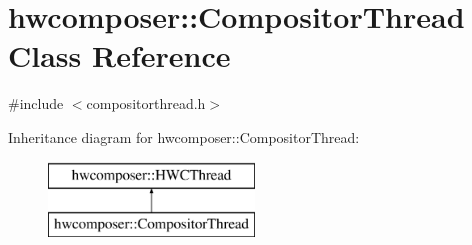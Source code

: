 \hypertarget{classhwcomposer_1_1CompositorThread}{}\section{hwcomposer\+:\+:Compositor\+Thread Class Reference}
\label{classhwcomposer_1_1CompositorThread}


{\ttfamily \#include $<$compositorthread.\+h$>$}

Inheritance diagram for hwcomposer\+:\+:Compositor\+Thread\+:\begin{figure}[H]
\begin{center}
\leavevmode
\includegraphics[height=2.000000cm]{classhwcomposer_1_1CompositorThread}
\end{center}
\end{figure}
